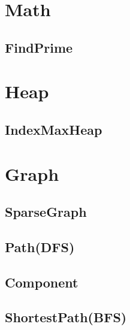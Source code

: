 \section{Math}
    \subsection{FindPrime}
        

\section{Heap}
    \subsection{IndexMaxHeap}
        

\section{Graph}
    \subsection{SparseGraph}
        
    \subsection{Path(DFS)}
        
    \subsection{Component}
        
    \subsection{ShortestPath(BFS)}
        